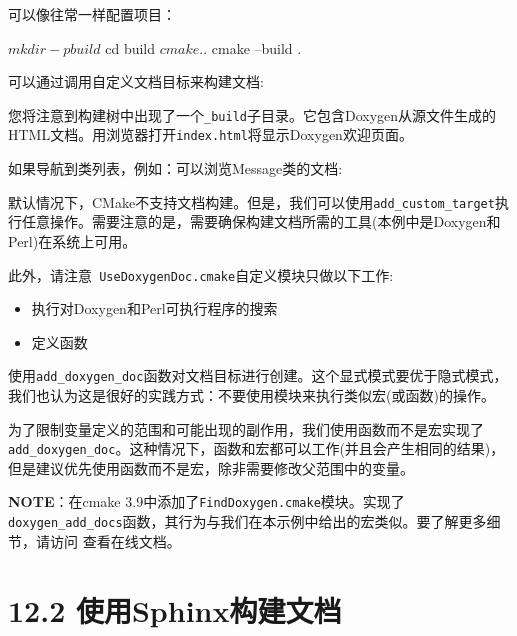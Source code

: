 可以像往常一样配置项目：

\begin{codebox}[shell]
$ mkdir -p build
$ cd build
$ cmake ..
$ cmake --build .
\end{codebox}

可以通过调用自定义文档目标来构建文档:


您将注意到构建树中出现了一个\texttt{\_build}子目录。它包含Doxygen从源文件生成的HTML文档。用浏览器打开\texttt{index.html}将显示Doxygen欢迎页面。

如果导航到类列表，例如：可以浏览Message类的文档:



默认情况下，CMake不支持文档构建。但是，我们可以使用\texttt{add\_custom\_target}执行任意操作。需要注意的是，需要确保构建文档所需的工具(本例中是Doxygen和Perl)在系统上可用。

此外，请注意\texttt{ UseDoxygenDoc.cmake}自定义模块只做以下工作:

\begin{itemize}
\item 执行对Doxygen和Perl可执行程序的搜索

\item 定义函数

\end{itemize}

使用\texttt{add\_doxygen\_doc}函数对文档目标进行创建。这个显式模式要优于隐式模式，我们也认为这是很好的实践方式：不要使用模块来执行类似宏(或函数)的操作。

为了限制变量定义的范围和可能出现的副作用，我们使用函数而不是宏实现了\texttt{add\_doxygen\_doc}。这种情况下，函数和宏都可以工作(并且会产生相同的结果)，但是建议优先使用函数而不是宏，除非需要修改父范围中的变量。

\begin{myInfoBox}
\textbf{NOTE}：在cmake 3.9中添加了\texttt{FindDoxygen.cmake}模块。实现了\texttt{doxygen\_add\_docs}函数，其行为与我们在本示例中给出的宏类似。要了解更多细节，请访问 查看在线文档。
\end{myInfoBox}


\section{12.2 使用Sphinx构建文档}

